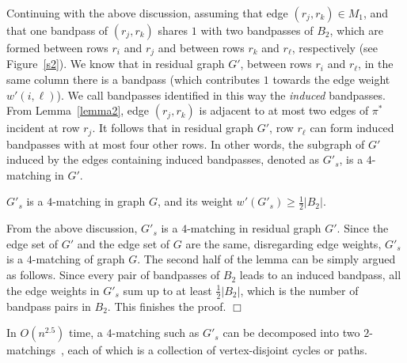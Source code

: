 \documentclass[11pt,twoside]{article}\usepackage{amssymb,latexsym,graphicx,hyperref}\usepackage{epstopdf}
\newenvironment{proof}{{\sc Proof. }}{\hfill$\Box$\vspace{0.2in}}
\begin{document}
Continuing with the above discussion, assuming that edge $(r_j, r_k) \in M_1$,
and that one bandpass of $(r_j, r_k)$ shares $1$ with two bandpasses of $B_2$,
which are formed between rows $r_i$ and $r_j$ and between rows $r_k$ and $r_\ell$, respectively (see Figure~\ref{s2}).
We know that in residual graph $G'$, between rows $r_i$ and $r_\ell$, in the same column there is a bandpass
(which contributes $1$ towards the edge weight $w'(i, \ell)$).
We call bandpasses identified in this way the {\em induced} bandpasses.
From Lemma~\ref{lemma2}, edge $(r_j, r_k)$ is adjacent to at most two edges of $\pi^*$ incident at row $r_j$.
It follows that in residual graph $G'$, row $r_\ell$ can form induced bandpasses with at most four other rows.
In other words, the subgraph of $G'$ induced by the edges containing induced bandpasses, denoted as $G'_s$, is a $4$-matching in $G'$.


\begin{lemma}
\label{lemma3}
$G'_s$ is a $4$-matching in graph $G$, and its weight $w'(G'_s) \ge \frac 12 |B_2|$.
\end{lemma}
\begin{proof}
From the above discussion, $G'_s$ is a $4$-matching in residual graph $G'$.
Since the edge set of $G'$ and the edge set of $G$ are the same, disregarding edge weights, $G'_s$ is a $4$-matching of graph $G$.
The second half of the lemma can be simply argued as follows.
Since every pair of bandpasses of $B_2$ leads to an induced bandpass, all the edge weights in $G'_s$ sum up to at least $\frac 12 |B_2|$,
which is the number of bandpass pairs in $B_2$.
This finishes the proof.
\end{proof}


In $O(n^{2.5})$ time, a $4$-matching such as $G'_s$ can be decomposed into two $2$-matchings~\cite{Har69,Die05},
each of which is a collection of vertex-disjoint cycles or paths.
\end{document}
